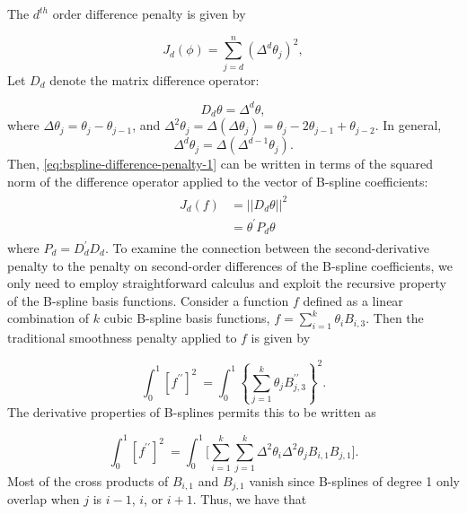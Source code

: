\bigskip

The $d^{th}$ order difference penalty is given by 

\begin{equation} \label{eq:bspline-difference-penalty-1}
J_d\left( \phi \right) = \sum_{j=d}^n \left(\Delta^d \theta_j\right)^2,
\end{equation} 
\noindent
Let $D_d$ denote the matrix difference operator:

\[
D_d\theta = \Delta^d \theta,
\]
\noindent
where $\Delta \theta_j = \theta_j - \theta_{j-1}$, and $\Delta^2 \theta_j = \Delta\left(\Delta \theta_j\right) = \theta_j - 2\theta_{j-1} + \theta_{j-2}$. In general,
\begin{equation*}
\Delta^d \theta_j = \Delta\left(\Delta^{d-1} \theta_j \right).
\end{equation*} 
\noindent
Then, \ref{eq:bspline-difference-penalty-1} can be written in terms of the squared norm of the difference operator applied to the vector of B-spline coefficients:
\begin{align} 
\begin{split} \label{eq:bspline-difference-penalty-2}
J_d\left( f \right) &= \vert \vert D_d\theta \vert \vert^2 \\
&= \theta^\prime P_d \theta
\end{split}
\end{align}
\noindent
where $P_d = D_d^\prime D_d$.  To examine the connection between the second-derivative penalty to the penalty on second-order differences of the B-spline coefficients, we only need to employ straightforward calculus and exploit the recursive property of the B-spline basis functions. Consider a function $f$ defined as a linear combination of $k$ cubic B-spline basis functions, $f = \sum_{i = 1}^k \theta_i B_{i,3}$. Then the traditional smoothness penalty applied to $f$ is given by

\begin{equation*} 
\int_0^1 \left[ f^{\prime \prime}\right]^2\ = \int_{0}^{1} \left\{ \sum\limits_{j=1}^k  \theta_j B_{j,3}^{\prime \prime} \right\}^2.
\end{equation*}
\noindent
The derivative properties of B-splines permits this to be written as 

\begin{equation*} \label{eq:second-derivative-bspline-penalty}
\int_0^1 \left[ f^{\prime \prime}\right]^2\ =  \int_{0}^{1}  \bigg[ \sum\limits_{i=1}^k \sum\limits_{j=1}^k \Delta^2 \theta_i \Delta^2 \theta_j B_{i,1}B_{j,1}\bigg]. 
\end{equation*}
\noindent
Most of the cross products of $B_{i,1}$ and $B_{j,1}$ vanish since B-splines of degree 1 only overlap when $j$ is $i-1$, $i$, or $i+1$. Thus, we have that

